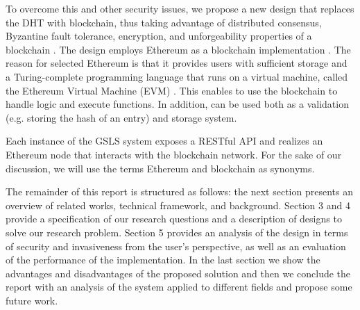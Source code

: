 To overcome this and other security issues, we propose a new design that replaces the DHT with blockchain, thus taking advantage of distributed consensus, Byzantine fault tolerance, encryption, and unforgeability properties of a blockchain \cite{nakamoto_bitcoin_2008}. The design employs Ethereum as a blockchain implementation \cite{wood_ethereum_2014}. The reason for selected Ethereum is that it provides users with sufficient storage and a Turing-complete programming language that runs on a virtual machine, called the Ethereum Virtual Machine (EVM) \cite{wood_ethereum_2014}. This enables to use the blockchain to handle logic and execute functions. In addition, can be used both as a validation (e.g. storing the hash of an entry) and storage system. 

Each instance of the GSLS system exposes a RESTful API and realizes an Ethereum node that interacts with the blockchain network. For the sake of our discussion, we will use the terms Ethereum and blockchain as synonyms.

The remainder of this report is structured as follows: the next section presents an overview of related works, technical framework, and background. Section 3 and 4 provide a specification of our research questions and a description of designs to solve our research problem. Section 5 provides an analysis of the design in terms of security and invasiveness from the user's perspective, as well as an evaluation of the performance of the implementation. In the last section we show the advantages and disadvantages of the proposed solution and then we conclude the report with an analysis of the system applied to different fields and propose some future work. 
